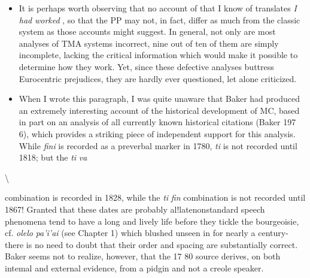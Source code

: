 \begin{itemize}
\begin{itemize}
\begin{itemize}
\begin{itemize}
\begin{itemize}
\begin{itemize}
\begin{itemize}

\item It is perhaps worth observing that no account of  that I know of translates \textit{I} \textit{had} \textit{worked} , so that the PP  may not, in fact, differ as much from the classic system as those ac\-counts might suggest. In general, not only are most analyses of TMA systems incorrect, nine out of ten of them are simply incomplete, lacking the critical information which would make it possible to deter\-mine how they work. Yet, since these defective analyses buttress Euro\-centric prejudices, they are hardly ever questioned, let alone criticized.
\item When I wrote this paragraph, I was quite unaware that Baker had produced an extremely interesting account of the historical de\-velopment of MC, based in part on an analysis of all currently known historical citations (Baker 197 6), which provides a striking piece of independent support for this analysis. While \textit{fini} is recorded as a pre\-verbal marker in 1780, \textit{ti }is not recorded until 1818; but the \textit{ti} \textit{va}
\end{itemize}

{\textbackslash}


combination is recorded in 1828, while the \textit{ti} \textit{fin} combination is not recorded until 1867! Granted that these dates are probably al!late\-nonstandard speech phenomena tend to have a long and lively life before they tickle the bourgeoisie, cf. \textit{olelo} \textit{pa'i'ai} (see Chapter 1) which blushed unseen in  for nearly a century-there is no need to doubt that their order and spacing are substantially correct. Baker seems not to realize, however, that the 17 80 source derives, on both intemal and external evidence, from a pidgin and not a creole speaker.


\end{itemize}
\end{itemize}
\end{itemize}
\end{itemize}
\end{itemize}
\end{itemize}

